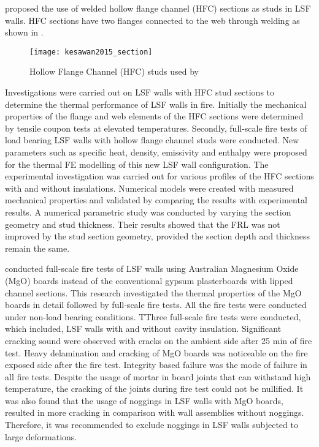 \citet{Kesawan2015} proposed the use of welded hollow flange channel (HFC) sections as studs in LSF walls. HFC sections have two flanges connected to the web through welding as shown in . 
\begin{figure}[htbp]
	\centering
		\texttt{[image: kesawan2015\_section]}		
		\caption{Hollow Flange Channel (HFC) studs used by \citet{Kesawan2015}}
		\label{fig:kesawan2015_test}
\end{figure}
Investigations were carried out on LSF walls with HFC stud sections to determine the thermal performance of LSF walls in fire. Initially the mechanical properties of the flange and web elements of the HFC sections were determined by tensile coupon tests at elevated temperatures. Secondly, full-scale fire tests of load bearing LSF walls with hollow flange channel studs were conducted. New parameters such as specific heat, density, emissivity and enthalpy were proposed for the thermal FE modelling of this new LSF wall configuration. The experimental investigation was carried out for various profiles of the HFC sections with and without insulations. Numerical models were created with measured mechanical properties and validated by comparing the results with experimental results. A numerical parametric study was conducted by varying the section geometry and stud thickness. Their results showed that the FRL was not improved by the stud section geometry, provided the section depth and thickness remain the same. 

\citet{Rusthi2017b} conducted full-scale fire tests of LSF walls using Australian Magnesium Oxide (MgO) boards instead of the conventional gypsum plasterboards with lipped channel sections. This research investigated the thermal properties of the MgO boards in detail followed by full-scale fire tests. All the fire tests were conducted under non-load bearing conditions. TThree full-scale fire tests were conducted, which included, LSF walls with and without cavity insulation. Significant cracking sound were observed with cracks on the ambient side after 25 min of fire test. Heavy delamination and cracking of MgO boards was noticeable on the fire exposed side after the fire test. Integrity based failure was the mode of failure in all fire tests. Despite the usage of mortar in board joints that can withstand high temperature, the cracking of the joints during fire test could not be nullified. It was also found that the usage of noggings in LSF walls with MgO boards, resulted in more cracking in comparison with wall assemblies without noggings. Therefore, it was recommended to exclude noggings in LSF walls subjected to large deformations.

